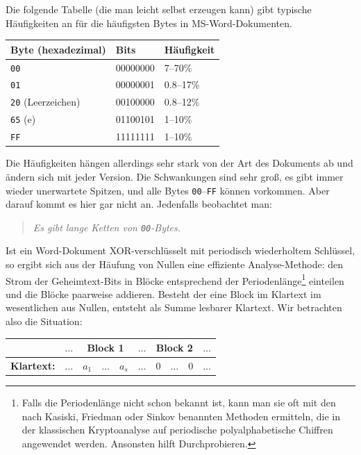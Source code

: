 \begin{refsegment}
Die folgende Tabelle (die man leicht selbst erzeugen kann) gibt
typische Häufigkeiten an für die häufigsten Bytes
in MS-Word-Dokumenten.
\begin{center}
\begin{tabular}{|l|l|l|} \hline
   {\bf Byte} (hexadezimal) & {\bf Bits} & {\bf Häufigkeit} \\ \hline
   {\tt 00}                 & 00000000   & 7--70\%          \\
   {\tt 01}                 & 00000001   & 0.8--17\%        \\
   {\tt 20} (Leerzeichen)   & 00100000   & 0.8--12\%        \\
   {\tt 65} (e)             & 01100101   & 1--10\%          \\
   {\tt FF}                 & 11111111   & 1--10\%          \\ \hline
\end{tabular}
\end{center}
Die Häufigkeiten hängen allerdings sehr stark von der Art des Dokuments ab und
ändern sich mit jeder Version. Die Schwankungen sind sehr groß, es gibt immer
wieder unerwartete Spitzen, und alle Bytes {\tt 00}--{\tt FF} können vorkommen.
Aber darauf kommt es hier gar nicht an. Jedenfalls beobachtet man:
\begin{quote}
   {\em Es gibt lange Ketten von {\tt 00}-Bytes.}
\end{quote}
Ist ein Word-Dokument XOR-verschlüsselt mit periodisch wiederholtem Schlüssel,
so ergibt sich aus der Häufung von Nullen eine effiziente Analyse-Methode:
den Strom der Geheimtext-Bits in Blöcke entsprechend der Periodenlänge\footnote{%
  Falls die Periodenlänge nicht schon bekannt ist, kann man sie oft mit
  den nach Kasiski, Friedman oder Sinkov benannten Methoden ermitteln,
  die in der klassischen Kryptoanalyse auf periodische polyalphabetische
  Chiffren angewendet werden. Ansonsten hilft Durchprobieren.
} einteilen
und die Blöcke paarweise addieren. Besteht der eine Block im Klartext im wesentlichen
aus Nullen, entsteht als Summe lesbarer Klartext. Wir betrachten also
die Situation:
\begin{center}
\begin{tabular}{rc|ccc|c|ccc|c}
                     & $\ldots$ & \multicolumn{3}{c|}{Block 1} & $\ldots$ & \multicolumn{3}{c|}{Block 2} & $\ldots$ \\
\hline
   {\bf Klartext:}   & $\ldots$ & $a_1$ & $\ldots$ & $a_s$     & $\ldots$ & $0$    & $\ldots$ & $0$      & $\ldots$ \\

\end{tabular}
\end{center}
\end{refsegment}
